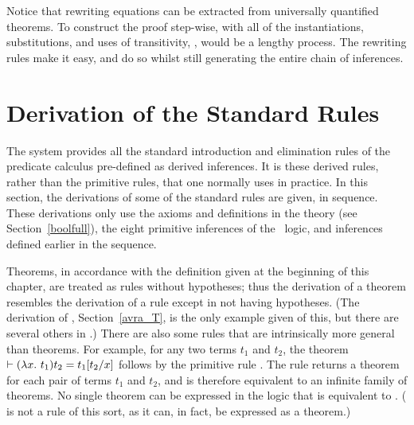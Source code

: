 \noindent Notice that rewriting
equations can be extracted from
universally quantified theorems.
To construct the
proof step-wise, with all of the instantiations,
substitutions, and uses of transitivity, \etc,
would be a lengthy process. The rewriting rules make it easy,
and do so whilst still generating the entire chain of inferences.

\section{Derivation of the Standard Rules}
\label{avra_standard}

%
The \HOL{} system provides all the standard introduction and
elimination rules of the predicate calculus pre-defined as derived
inferences.  It is these derived rules, rather than the primitive
rules, that one normally uses in practice.  In this section, the
derivations of some of the standard rules are given, in sequence.
These derivations only use the axioms and definitions in the theory
 (see Section~\ref{boolfull}), the eight primitive
inferences of the \HOL\ logic, and inferences defined earlier in the
sequence.

Theorems,%
%
%
%
in accordance with the definition given at the beginning of this
chapter, are treated as rules without hypotheses; thus the derivation
of a theorem resembles the derivation of a rule except in not having
hypotheses. (The derivation of , Section~\ref{avra_T}, is
the only example given of this, but there are several others in \HOL.)
There are also some rules that are intrinsically more general than
theorems.  For example, for any two terms $t_1$ and $t_2$, the theorem
$\vdash(\lambda x.\ t_1)t_2 = t_1[t_2/x]$ follows by the primitive rule
. The rule  returns a theorem for each
pair of terms $t_1$ and $t_2$, and is therefore equivalent to an
infinite family%
%
%
%
of theorems. No single theorem can be expressed in the \HOL{} logic
that is equivalent to .%
%
%
( is not a rule of this sort, as it can, in fact, be
expressed as a theorem.)


